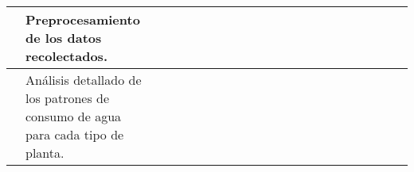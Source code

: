 \begin{landscape}
\begin{ThreePartTable}
\begin{longtable}{|p{}|p{5.5cm}|p{5.5cm}|l|l|l|l|l|l|l|l|l|l|l|l|l|l|l|l|l|l|l|}
      \cline{2-2}\cline{4-21}
                                                                                                                                                                                               & Preprocesamiento de los datos recolectados.                                                &                                                                                                                   &                                       &                                       & \cellcolor{magenta!70}                & \cellcolor{magenta!70}                &                        &                        &                        &                        &                        &                        &                        &                        &                        &                        &                        \\
      \hline
      \newpage
      \hline
      \cline{2-2}\cline{4-21}
                                                                                                                                                                                               & Análisis detallado de los patrones de consumo de agua para cada tipo de planta.            &                                                                                                                   &                                       &                                       &                                       & \cellcolor{magenta!70}                &                        &                        &                        &                        &                        &                        &                        &                        &                        &                        &                        \\
      \cline{2-2}\cline{4-21}


\end{longtable}
\end{ThreePartTable}
\end{landscape}
